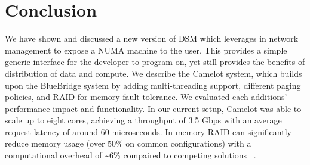 \section{Conclusion}
\label{sec:conclusion}

We have shown and discussed a new version of DSM which leverages in network
management to expose a NUMA machine to the user. This provides a simple
generic interface for the developer to program on, yet still provides the
benefits of distribution of data and compute. We describe the Camelot system,
which builds upon the BlueBridge system by adding multi-threading support,
different paging policies, and RAID for memory fault tolerance. We evaluated
each additions' performance impact and functionality. In our current setup, Camelot was able to scale 
up to eight cores, achieving a throughput of 3.5 Gbps with an average request latency of around 60 
microseconds. In memory RAID can significantly reduce
memory usage (over 50\% on common configurations) with a computational overhead
of \textasciitilde6\% compaired to competing solutions~
\cite{Ousterhout:2015:RSS:2818727.2806887}.